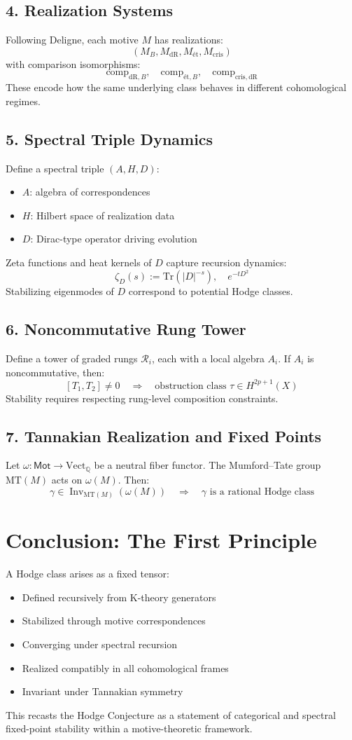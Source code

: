 \documentclass[12pt]{article}
\begin{document}
\subsection*{4. Realization Systems}
Following Deligne, each motive \( M \) has realizations:
\[
(M_B, M_{\mathrm{dR}}, M_{\text{\'et}}, M_{\text{cris}})
\]
with comparison isomorphisms:
\[
\text{comp}_{\mathrm{dR},B}, \quad \text{comp}_{\text{\'et},B}, \quad \text{comp}_{\text{cris},\mathrm{dR}}
\]
These encode how the same underlying class behaves in different cohomological regimes.

\subsection*{5. Spectral Triple Dynamics}
Define a spectral triple \( (A, H, D) \):
\begin{itemize}
  \item \( A \): algebra of correspondences
  \item \( H \): Hilbert space of realization data
  \item \( D \): Dirac-type operator driving evolution
\end{itemize}
Zeta functions and heat kernels of \( D \) capture recursion dynamics:
\[
\zeta_D(s) := \text{Tr}(|D|^{-s}), \quad e^{-t D^2}
\]
Stabilizing eigenmodes of \( D \) correspond to potential Hodge classes.

\subsection*{6. Noncommutative Rung Tower}
Define a tower of graded rungs \( \mathcal{R}_i \), each with a local algebra \( A_i \). If \( A_i \) is noncommutative, then:
\[
[T_1, T_2] \neq 0 \quad \Rightarrow \quad \text{obstruction class } \tau \in H^{2p+1}(X)
\]
Stability requires respecting rung-level composition constraints.

\subsection*{7. Tannakian Realization and Fixed Points}
Let \( \omega: \mathsf{Mot} \to \text{Vect}_{\mathbb{Q}} \) be a neutral fiber functor. The Mumford–Tate group \( \mathrm{MT}(M) \) acts on \( \omega(M) \). Then:
\[
\gamma \in \operatorname{Inv}_{\mathrm{MT}(M)}(\omega(M)) \quad \Rightarrow \quad \gamma \text{ is a rational Hodge class}
\]

\section{Conclusion: The First Principle}
A Hodge class arises as a fixed tensor:
\begin{itemize}
  \item Defined recursively from K-theory generators
  \item Stabilized through motive correspondences
  \item Converging under spectral recursion
  \item Realized compatibly in all cohomological frames
  \item Invariant under Tannakian symmetry
\end{itemize}

This recasts the Hodge Conjecture as a statement of categorical and spectral fixed-point stability within a motive-theoretic framework.
\end{document}
